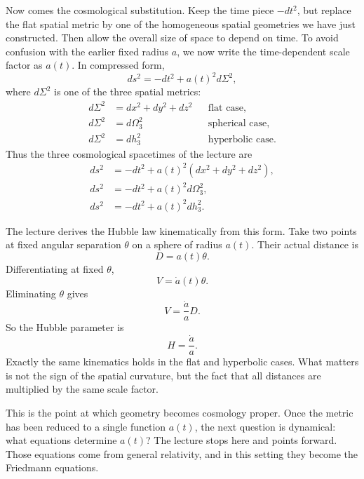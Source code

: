 Now comes the cosmological substitution. Keep the time piece \(-dt^2\), but replace the flat spatial metric by one of the homogeneous spatial geometries we have just constructed. Then allow the overall size of space to depend on time. To avoid confusion with the earlier fixed radius \(a\), we now write the time-dependent scale factor as \(a(t)\). In compressed form,
\begin{equation}
ds^2 = -dt^2 + a(t)^2 d\Sigma^2,
\end{equation}
where \(d\Sigma^2\) is one of the three spatial metrics:
\begin{align}
d\Sigma^2 &= dx^2 + dy^2 + dz^2 && \text{flat case},\\
d\Sigma^2 &= d\Omega_3^2 && \text{spherical case},\\
d\Sigma^2 &= dh_3^2 && \text{hyperbolic case}.
\end{align}
Thus the three cosmological spacetimes of the lecture are
\begin{align}
ds^2 &= -dt^2 + a(t)^2\left(dx^2+dy^2+dz^2\right),\\
ds^2 &= -dt^2 + a(t)^2 d\Omega_3^2,\\
ds^2 &= -dt^2 + a(t)^2 dh_3^2.
\end{align}

The lecture derives the Hubble law kinematically from this form. Take two points at fixed angular separation \(\theta\) on a sphere of radius \(a(t)\). Their actual distance is
\begin{equation}
D = a(t)\theta.
\end{equation}
Differentiating at fixed \(\theta\),
\begin{equation}
V = \dot a(t)\theta.
\end{equation}
Eliminating \(\theta\) gives
\begin{equation}
V = \frac{\dot a}{a} D.
\end{equation}
So the Hubble parameter is
\begin{equation}
H = \frac{\dot a}{a}.
\end{equation}
Exactly the same kinematics holds in the flat and hyperbolic cases. What matters is not the sign of the spatial curvature, but the fact that all distances are multiplied by the same scale factor.

This is the point at which geometry becomes cosmology proper. Once the metric has been reduced to a single function \(a(t)\), the next question is dynamical: what equations determine \(a(t)\)? The lecture stops here and points forward. Those equations come from general relativity, and in this setting they become the Friedmann equations.

